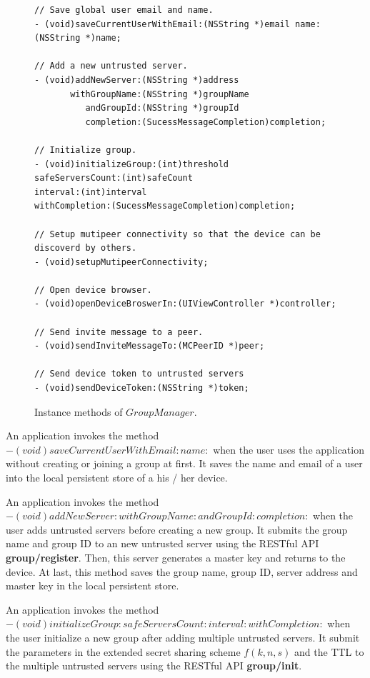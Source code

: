\documentclass[a4paper,11pt]{report}
\begin{document}
\begin{figure}
\begin{lstlisting}[frame=none language=Objective-C] 
// Save global user email and name.
- (void)saveCurrentUserWithEmail:(NSString *)email name:(NSString *)name;

// Add a new untrusted server.
- (void)addNewServer:(NSString *)address
       withGroupName:(NSString *)groupName
          andGroupId:(NSString *)groupId
          completion:(SucessMessageCompletion)completion;

// Initialize group.
- (void)initializeGroup:(int)threshold
safeServersCount:(int)safeCount
interval:(int)interval
withCompletion:(SucessMessageCompletion)completion;

// Setup mutipeer connectivity so that the device can be discoverd by others.
- (void)setupMutipeerConnectivity;

// Open device browser.
- (void)openDeviceBroswerIn:(UIViewController *)controller;

// Send invite message to a peer.
- (void)sendInviteMessageTo:(MCPeerID *)peer;

// Send device token to untrusted servers
- (void)sendDeviceToken:(NSString *)token;	
\end{lstlisting}
\caption{Instance methods of $GroupManager$.}
\label{fig:group_manager}
\end{figure}

An application invokes the method $- (void)saveCurrentUserWithEmail:name:$ when the user uses the application without creating or joining a group at first.
It saves the name and email of a user into the local persistent store of a his / her device.

An application invokes the method $- (void)addNewServer:withGroupName:andGroupId:completion:$ when the user adds untrusted servers before creating a new group. 
It submits the group name and group ID to an new untrusted server using the RESTful API \textbf{group/register}.
Then, this server generates a master key and returns to the device.
At last, this method saves the group name, group ID, server address and master key in the local persistent store.

An application invokes the method $- (void)initializeGroup:safeServersCount:interval:withCompletion:$  when the user initialize a new group after adding multiple untrusted servers.
It submit the parameters in the extended secret sharing scheme $f(k, n, s)$ and the TTL to the multiple untrusted servers using the RESTful API \textbf{group/init}.
\end{document}
